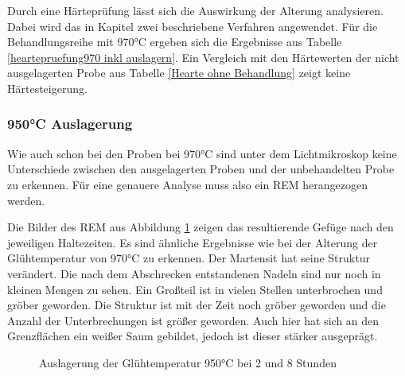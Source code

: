 \documentclass[a4paper, 11pt]{tubsreprt}
\begin{document}
Durch eine Härteprüfung lässt sich die Auswirkung der Alterung analysieren. Dabei wird das in Kapitel zwei beschriebene Verfahren angewendet. Für die Behandlungsreihe mit 970°C ergeben sich die Ergebnisse aus Tabelle \ref{heartepruefung970 inkl auslagern}. Ein Vergleich mit den Härtewerten der nicht ausgelagerten Probe aus Tabelle \ref{Hearte ohne Behandlung} zeigt keine Härtesteigerung. 
\subsubsection{950°C Auslagerung}
Wie auch schon bei den Proben bei 970°C sind unter dem Lichtmikroskop keine Unterschiede zwischen den ausgelagerten Proben und der unbehandelten Probe zu erkennen. Für eine genauere Analyse muss also ein REM herangezogen werden.

Die Bilder des REM aus Abbildung \ref{REM 950 2 und 8} zeigen das resultierende Gefüge nach den jeweiligen Haltezeiten. Es sind ähnliche Ergebnisse wie bei der Alterung der Glühtemperatur von 970°C zu erkennen. Der Martensit hat seine Struktur verändert. Die nach dem Abschrecken entstandenen Nadeln sind nur noch in kleinen Mengen zu sehen. Ein Großteil ist in vielen Stellen unterbrochen und gröber geworden. Die Struktur ist mit der Zeit noch gröber geworden und die Anzahl der Unterbrechungen ist größer geworden. Auch hier hat sich an den Grenzflächen ein weißer Saum gebildet,  jedoch ist dieser stärker ausgeprägt.
\begin{figure}
\label{REM 950 2 und 8}
\caption{Auslagerung der Glühtemperatur 950°C bei 2 und 8 Stunden}
\end{figure}
\end{document}
